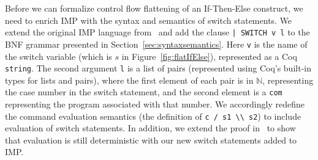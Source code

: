 \documentclass[compsoc,conference,a4paper,10pt,times]{IEEEtran}
\newtheorem{theorem}{Theorem}[section]
\begin{document}
%
%
%
Before we can formalize control flow flattening of an If-Then-Else construct, we need to enrich IMP with the syntax and semantics of switch statements. We extend the original IMP language from~\cite{SFV2} and add the clause \texttt{| SWITCH v l} to the BNF grammar presented in Section~\ref{sec:syntaxsemantics}.  Here \texttt{v} is the name of the switch variable (which is $s$ in Figure~\ref{fig:flatIfElse}), represented as a Coq \texttt{string}.  The second argument \texttt{l} is a list of pairs (represented using Coq's built-in types for lists and pairs), where the first element of each pair is in $\mathbb{N}$, representing the case number in the switch statement, and the second element is a \texttt{com} representing the program associated with that number.
We accordingly redefine the command evaluation semantics (the definition of \verb|c / s1 \\ s2|) to include evaluation of switch statements.  In addition, we extend the proof in~\cite{SFV2} to show that evaluation is still deterministic with our new switch statements added to IMP.


\end{document}
